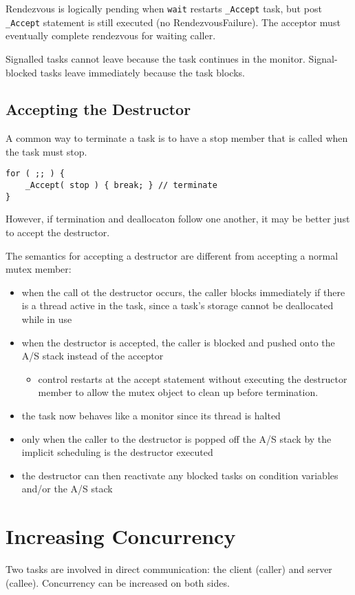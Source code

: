 \documentclass[11pt]{article}
\begin{document}
Rendezvous is logically pending when \texttt{wait} restarts \texttt{\_Accept} task, but post \texttt{\_Accept} statement
is still executed (no RendezvousFailure).
The acceptor must eventually complete rendezvous for waiting caller.

Signalled tasks cannot leave because the task continues in the monitor.
Signal-blocked tasks leave immediately because the task blocks.
\subsection{Accepting the Destructor}
\label{sec:orgbd85bf6}
A common way to terminate a task is to have a stop member that is called when the task must stop.
\begin{verbatim}
for ( ;; ) {
    _Accept( stop ) { break; } // terminate
}
\end{verbatim}
However, if termination and deallocaton follow one another, it may be better just to
accept the destructor.

The semantics for accepting a destructor are different from accepting a normal mutex
member:
\begin{itemize}
\item when the call ot the destructor occurs, the caller blocks immediately if there
is a thread active in the task, since a task's storage cannot be deallocated while
in use
\item when the destructor is accepted, the caller is blocked and pushed onto the A/S stack
instead of the acceptor
\begin{itemize}
\item control restarts at the accept statement without executing the destructor member
to allow the mutex object to clean up before termination.
\end{itemize}
\item the task now behaves like a monitor since its thread is halted
\item only when the caller to the destructor is popped off the A/S stack by the implicit
scheduling is the destructor executed
\item the destructor can then reactivate any blocked tasks on condition variables and/or
the A/S stack
\end{itemize}
\section{Increasing Concurrency}
\label{sec:orgb5c7016}
Two tasks are involved in direct communication: the client (caller) and server (callee).
Concurrency can be increased on both sides.
\end{document}
